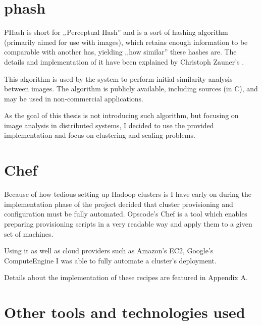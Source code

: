 \section{phash}
\label{sec:phash}
PHash is short for ,,Perceptual Hash'' and is a sort of hashing algorithm (primarily aimed for use with images), which retains enough information to be 
comparable with another has, yielding ,,how similar'' these hashes are. The details and implementation of it have been explained by Christoph Zauner's \cite{phash}.

This algorithm is used by the system to perform initial similarity analysis between images. 
The algorithm is publicly available, including sources (in C), and may be used in non-commercial applications.

As the goal of this thesis is not introducing such algorithm, but focusing on image analysis in distributed systems,
I decided to use the provided implementation and focus on clustering and scaling problems.

\section{Chef}
\label{sec:chef}
Because of how tedious setting up Hadoop clusters is I have early on during the implementation phase of the project decided that cluster 
provisioning and configuration must be fully automated. Opscode's Chef is a tool which enables preparing provisioning scripts in a very readable
way and apply them to a given set of machines.

Using it as well as cloud providers such as Amazon's EC2, Google's ComputeEngine I was able to fully automate a cluster's deployment.


Details about the implementation of these recipes are featured in Appendix A.


\section{Other tools and technologies used}
\label{sec:other tools}

